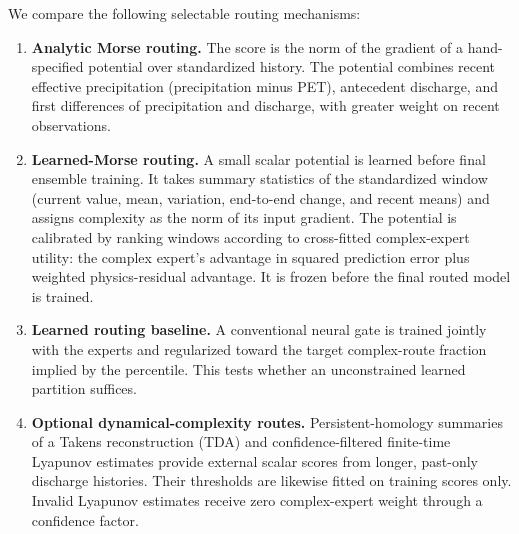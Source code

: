 \documentclass[11pt]{article}
\begin{document}
We compare the following selectable routing mechanisms:
\begin{enumerate}[leftmargin=*]
  \item \textbf{Analytic Morse routing.} The score is the norm of the gradient of a hand-specified potential over standardized history. The potential combines recent effective precipitation (precipitation minus PET), antecedent discharge, and first differences of precipitation and discharge, with greater weight on recent observations.
  \item \textbf{Learned-Morse routing.} A small scalar potential is learned before final ensemble training. It takes summary statistics of the standardized window (current value, mean, variation, end-to-end change, and recent means) and assigns complexity as the norm of its input gradient. The potential is calibrated by ranking windows according to cross-fitted complex-expert utility: the complex expert's advantage in squared prediction error plus weighted physics-residual advantage. It is frozen before the final routed model is trained.
  \item \textbf{Learned routing baseline.} A conventional neural gate is trained jointly with the experts and regularized toward the target complex-route fraction implied by the percentile. This tests whether an unconstrained learned partition suffices.
  \item \textbf{Optional dynamical-complexity routes.} Persistent-homology summaries of a Takens reconstruction (TDA) and confidence-filtered finite-time Lyapunov estimates provide external scalar scores from longer, past-only discharge histories. Their thresholds are likewise fitted on training scores only. Invalid Lyapunov estimates receive zero complex-expert weight through a confidence factor.
\end{enumerate}
\end{document}
